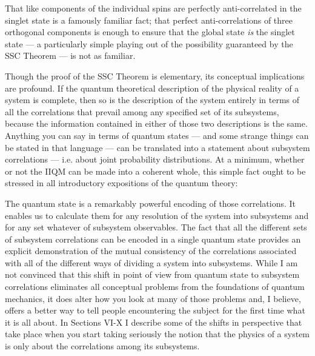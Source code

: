 That like components of the individual spins are perfectly
anti-correlated in the singlet state is a famously familiar fact; that
perfect anti-correlations of three orthogonal components is enough to
ensure that the global state {\it is\/} the singlet state --- a
particularly simple playing out of the possibility guaranteed by
the SSC Theorem --- is not as familiar. 
 
Though the proof of the SSC Theorem is elementary, its conceptual
implications are profound.  If the quantum theoretical description of
the physical reality of a system is complete, then so is the
description of the system entirely in terms of all the correlations
that prevail among any specified set of its subsystems, because the
information contained in either of those two descriptions is the
same.  Anything you can say in terms of quantum states --- and some
strange things can be stated in that language --- can be translated
into a statement about subsystem correlations --- i.e.  about joint
probability distributions.  At a minimum, whether or not the IIQM can
be made into a coherent whole, this simple fact ought to be stressed
in all introductory expositions of the quantum theory: 

The quantum state is a remarkably powerful encoding of those
correlations.  It enables us to calculate them for any resolution of
the system into subsystems and for any set whatever of subsystem
observables.  The fact that all the different sets of subsystem
correlations can be encoded in a single quantum state provides an
explicit demonstration of the mutual consistency of the correlations
associated with all of the different ways of dividing a system into
subsystems.  While I am not convinced that this shift in point of view
from quantum state to subsystem correlations eliminates all conceptual
problems from the foundations of quantum mechanics, it does alter how
you look at many of those problems and, I believe, offers a better way
to tell people encountering the subject for the first time what it is
all about.  In Sections VI-X I describe some of the shifts in
perspective that take place when you start taking seriously the notion
that the physics of a system is only about the correlations among its
subsystems.

